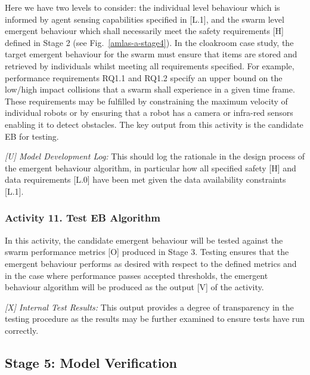 \documentclass[runningheads]{llncs}
\begin{document}
Here we have two levels to consider: the individual level behaviour which is informed by agent sensing capabilities specified in [L.1], and the swarm level emergent behaviour which shall necessarily meet the safety requirements [H] defined in Stage 2 (see Fig.~\ref{amlas-a-stage4}). In the cloakroom case study, the target emergent behaviour for the swarm must ensure that items are stored and retrieved by individuals whilst meeting all requirements specified. For example, performance requirements RQ1.1 and RQ1.2 specify an upper bound on the low/high impact collisions that a swarm shall experience in a given time frame. These requirements may be fulfilled by constraining the maximum velocity of individual robots or by ensuring that a robot has a camera or infra-red sensors enabling it to detect obstacles. The key output from this activity is the candidate EB for testing.

\emph{[U] Model Development Log:} This should log the rationale in the design process of the emergent behaviour algorithm, in particular how all specified safety [H] and data requirements [L.0] have been met given the data availability constraints [L.1].

\subsubsection*{Activity 11. Test EB Algorithm}

In this activity, the candidate emergent behaviour will be tested against the swarm performance metrics [O] produced in Stage 3. Testing ensures that the emergent behaviour performs as desired with respect to the defined metrics and in the case where performance passes accepted thresholds, the emergent behaviour algorithm will be produced as the output [V] of the activity. 

\emph{[X] Internal Test Results:} This output provides a degree of transparency in the testing procedure as the results may be further examined to ensure tests have run correctly.



\subsection{Stage 5: Model Verification} \label{framework-stage5}
\end{document}
